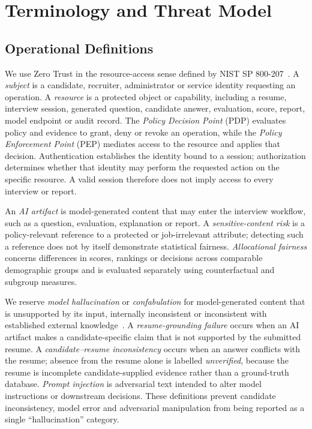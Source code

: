 \documentclass[conference]{IEEEtran}
\begin{document}
\section{Terminology and Threat Model}

\subsection{Operational Definitions}

We use Zero Trust in the resource-access sense defined by NIST SP 800-207~\cite{rose2020zero}. A \emph{subject} is a candidate, recruiter, administrator or service identity requesting an operation. A \emph{resource} is a protected object or capability, including a resume, interview session, generated question, candidate answer, evaluation, score, report, model endpoint or audit record. The \emph{Policy Decision Point} (PDP) evaluates policy and evidence to grant, deny or revoke an operation, while the \emph{Policy Enforcement Point} (PEP) mediates access to the resource and applies that decision. Authentication establishes the identity bound to a session; authorization determines whether that identity may perform the requested action on the specific resource. A valid session therefore does not imply access to every interview or report.

An \emph{AI artifact} is model-generated content that may enter the interview workflow, such as a question, evaluation, explanation or report. A \emph{sensitive-content risk} is a policy-relevant reference to a protected or job-irrelevant attribute; detecting such a reference does not by itself demonstrate statistical fairness. \emph{Allocational fairness} concerns differences in scores, rankings or decisions across comparable demographic groups and is evaluated separately using counterfactual and subgroup measures.

We reserve \emph{model hallucination} or \emph{confabulation} for model-generated content that is unsupported by its input, internally inconsistent or inconsistent with established external knowledge~\cite{nist2024genai}. A \emph{resume-grounding failure} occurs when an AI artifact makes a candidate-specific claim that is not supported by the submitted resume. A \emph{candidate--resume inconsistency} occurs when an answer conflicts with the resume; absence from the resume alone is labelled \emph{unverified}, because the resume is incomplete candidate-supplied evidence rather than a ground-truth database. \emph{Prompt injection} is adversarial text intended to alter model instructions or downstream decisions. These definitions prevent candidate inconsistency, model error and adversarial manipulation from being reported as a single ``hallucination'' category.
\end{document}
